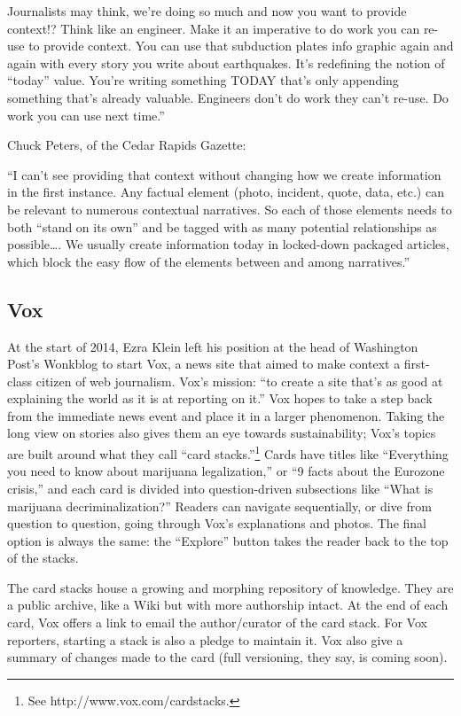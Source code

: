 Journalists may think, we’re doing so much and now you want to provide context!? Think like an engineer. Make it an imperative to do work you can re-use to provide context. You can use that subduction plates info graphic again and again with every story you write about earthquakes. It’s redefining the notion of “today” value. You’re writing something TODAY that’s only appending something that’s already valuable. Engineers don’t do work they can’t re-use. Do work you can use next time.''

Chuck Peters, of the Cedar Rapids Gazette:

``I can’t see providing that context without changing how we create information in the first instance. Any factual element (photo, incident, quote, data, etc.) can be relevant to numerous contextual narratives. So each of those elements needs to both “stand on its own” and be tagged with as many potential relationships as possible…. We usually create information today in locked-down packaged articles, which block the easy flow of the elements between and among narratives.''

\subsection{Vox}

At the start of 2014, Ezra Klein left his position at the head of Washington Post's Wonkblog to start Vox, a news site that aimed to make context a first-class citizen of web journalism. Vox's mission: ``to create a site that's as good at explaining the world as it is at reporting on it.''\autocite{} Vox hopes to take a step back from the immediate news event and place it in a larger phenomenon. Taking the long view on stories also gives them an eye towards sustainability; Vox's topics are built around what they call ``card stacks.''\footnote{See http://www.vox.com/cardstacks.} Cards have titles like ``Everything you need to know about marijuana legalization,'' or ``9 facts about the Eurozone crisis,'' and each card is divided into question-driven subsections like ``What is marijuana decriminalization?'' Readers can navigate sequentially, or dive from question to question, going through Vox's explanations and photos. The final option is always the same: the ``Explore'' button takes the reader back to the top of the stacks.

The card stacks house a growing and morphing repository of knowledge. They are a public archive, like a Wiki but with more authorship intact. At the end of each card, Vox offers a link to email the author/curator of the card stack. For Vox reporters, starting a stack is also a pledge to maintain it. Vox also give a summary of changes made to the card (full versioning, they say, is coming soon).


